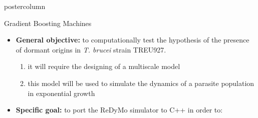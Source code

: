\documentclass[final,hyperref={pdfpagelabels=false}]{beamer}
\begin{document}
\begin{frame}
\begin{columns}
\begin{column}{.497\textwidth}
\begin{beamercolorbox}[center,wd=\textwidth]{postercolumn}
\begin{minipage}[T]{.95\textwidth}
{\begin{block}{\protect Gradient Boosting Machines}
\parbox[t][]{0.95\textwidth}
{
\begin{itemize}
    \item {\bf General objective:} to computationally test the hypothesis of the presence of dormant origins in {\em T. brucei} strain TREU927.
    \begin{enumerate}
        \item it will require the designing of a multiscale model
        \item this model will be used to simulate the dynamics of a parasite population in exponential growth
    \end{enumerate}
    \bigskip
    \item {\bf Specific goal:} to port the ReDyMo simulator to C++ in order to:
\end{itemize}
}
\end{block}


}
\end{minipage}
\end{beamercolorbox}
\end{column}
\end{columns}
\end{frame}
\end{document}
